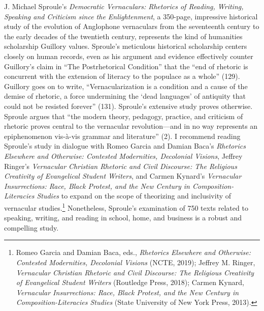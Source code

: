 \documentclass{tufte-handout}
\begin{document}
J. Michael Sproule's \emph{Democratic Vernaculars: Rhetorics of Reading,
Writing, Speaking and Criticism since the Enlightenment}, a 350-page,
impressive historical study of the evolution of Anglophone vernaculars
from the seventeenth century to the early decades of the twentieth
century, represents the kind of humanities scholarship Guillory values.
Sproule's meticulous historical scholarship centers closely on human
records, even as his argument and evidence effectively counter
Guillory's claim in ``The Postrhetorical Condition'' that the ``end of
rhetoric is concurrent with the extension of literacy to the populace as
a whole'' (129). Guillory goes on to write, ``Vernacularization is a
condition and a cause of the demise of rhetoric, a force undermining the
`dead languages' of antiquity that could not be resisted forever''
(131). Sproule's extensive study proves otherwise. Sproule argues that
``the modern theory, pedagogy, practice, and criticism of rhetoric
proves central to the vernacular revolution---and in no way represents
an epiphenomenon vis-à-vis grammar and literature'' (2). I recommend
reading Sproule's study in dialogue with Romeo Garcia and Damian Baca's
\emph{Rhetorics Elsewhere and Otherwise: Contested Modernities,
Decolonial Visions}, Jeffrey Ringer's \emph{Vernacular Christian
Rhetoric and Civil Discourse: The Religious Creativity of Evangelical
Student Writers}, and Carmen Kynard's \emph{Vernacular Insurrections:
Race, Black Protest, and the New Century in Composition-Literacies
Studies} to expand on the scope of theorizing and inclusivity of
vernacular studies.\footnote{Romeo Garcia and Damian Baca, eds.,
  \emph{Rhetorics Elsewhere and Otherwise: Contested Modernities,
  Decolonial Visions} (NCTE, 2019); Jeffrey M. Ringer, \emph{Vernacular
  Christian Rhetoric and Civil Discourse: The Religious Creativity of
  Evangelical Student Writers} (Routledge Press, 2018); Carmen Kynard,
  \emph{Vernacular Insurrections: Race, Black Protest, and the New
  Century in Composition-Literacies Studies} (State University of New
  York Press, 2013).} Nonetheless, Sproule's examination of 750 texts
related to speaking, writing, and reading in school, home, and business
is a robust and compelling study.
\end{document}
